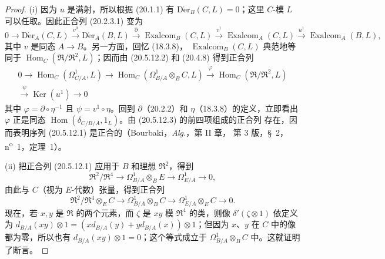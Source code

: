\begin{proof}
(i) 因为 $u$ 是满射，所以根据 (20.1.1) 有
$\operatorname{D\acute{e}r}_B(C,L)=0$；这里 $C$-模 $L$ 可以任取。因此正合列
(20.2.3.1) 变为
\begin{equation}
\tag{20.5.12.2}
\label{0.20.5.12.2-fr}
  0\longrightarrow\operatorname{D\acute{e}r}_A(C,L)\xrightarrow{v^0}\operatorname{D\acute{e}r}_A(B,L)
  \xrightarrow{\partial}\operatorname{Exalcom}_B(C,L)
  \xrightarrow{v^1}\operatorname{Exalcom}_A(C,L)
  \xrightarrow{u^1}\operatorname{Exalcom}_A(B,L),
\end{equation}
其中 $v$ 是同态 $A\to B$。另一方面，回忆 (18.3.8)，
$\operatorname{Exalcom}_B(C,L)$ 典范地等同于
$\operatorname{Hom}_C(\mathfrak{R}/\mathfrak{R}^2,L)$；因而由 (20.5.12.2)
和 (20.4.8) 得到正合列
\begin{equation}
\tag{20.5.12.3}
\label{0.20.5.12.3-fr}
\begin{split}
  0\longrightarrow\operatorname{Hom}_C(\Omega^1_{C/A},L)
  \longrightarrow\operatorname{Hom}_C(\Omega^1_{B/A}\otimes_B C,L)
  \xrightarrow{\varphi}\operatorname{Hom}_C(\mathfrak{R}/\mathfrak{R}^2,L)\\
  \xrightarrow{\psi}\operatorname{Ker}(u^1)\longrightarrow 0
\end{split}
\end{equation}
其中 $\varphi=\partial\circ\eta^{-1}$ 且 $\psi=v^1\circ\eta$。回到
$\partial$（20.2.2）和 $\eta$（18.3.8）的定义，立即看出 $\varphi$ 正是同态
$\operatorname{Hom}(\delta_{C/B/A},1_L)$。由 (20.5.12.3) 的前四项组成的正合列
存在，因而表明序列 (20.5.12.1) 是正合的（Bourbaki，\emph{Alg.}，第 II 章，
第 3 版，\S~2，n\textsuperscript{o}~1，定理~1）。

\medskip
(ii) 把正合列 (20.5.12.1) 应用于 $B$ 和理想 $\mathfrak{R}^2$，得到
\begin{equation}
\tag{20.5.12.4}
\label{0.20.5.12.4-fr}
  \mathfrak{R}^2/\mathfrak{R}^4\longrightarrow
  \Omega^1_{B/A}\otimes_B E\longrightarrow\Omega^1_{E/A}\longrightarrow 0,
\end{equation}
由此与 $C$（视为 $E$-代数）张量，得到正合列
\[
  \mathfrak{R}^2/\mathfrak{R}^4\otimes_E C\longrightarrow
  \Omega^1_{B/A}\otimes_B C\longrightarrow
  \Omega^1_{E/A}\otimes_E C\longrightarrow 0.
\]
现在，若 $x,y$ 是 $\mathfrak{R}$ 的两个元素，而 $\zeta$ 是 $xy$ 模
$\mathfrak{R}^4$ 的类，则像 $\delta'(\zeta\otimes1)$ 依定义为
$d_{B/A}(xy)\otimes1=(xd_{B/A}(y)+yd_{B/A}(x))\otimes1$；但因为 $x$、$y$
在 $C$ 中的像都为零，所以也有 $d_{B/A}(xy)\otimes1=0$；这个等式成立于
$\Omega^1_{B/A}\otimes_B C$ 中。这就证明了断言。


\end{proof}
